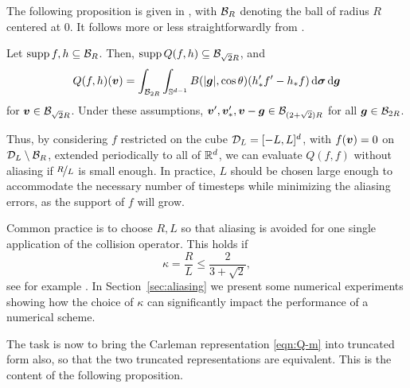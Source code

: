 The following proposition is given in \cite{Pareschi00}, with $\mathcal{B}_R$ denoting
the ball of radius $R$ centered at $0$. It follows more or less straightforwardly from \cite{Pareschi96}.
\begin{proposition} \label{prop:trunc}
Let $\operatorname{supp} f,h\subseteq\mathcal{B}_R$. Then, $\operatorname{supp} Q(f,h)\subseteq\mathcal{B}_{\sqrt{2}R}$, and 
\[ 
    Q(f,h)({\bm v}) = \int_{\mathcal{B}_{2R}}\int_{\mathbb{S}^{d-1}} 
            B(|{\bm g}|,\cos\theta)(h_*'f'-h_*f)\,\mathrm{d}{\bm\sigma} \,\mathrm{d} {\bm g} 
\]
for ${\bm v}\in\mathcal{B}_{\sqrt{2}R}$. Under these assumptions,
${\bm v}',{\bm v}_*',{\bm v}-{\bm g}\in\mathcal{B}_{(2+\sqrt{2})R}$ for all ${\bm g}\in\mathcal{B}_{2R}$.
\end{proposition}
Thus, by considering $f$ restricted on the cube $\mathcal{D}_L=[-L,L]^d$, with
$f({\bm v})=0$ on $\mathcal{D}_L\setminus\mathcal{B}_R$, extended periodically to all of $\mathbb{R}^d$, we
can evaluate $Q(f,f)$ without aliasing if $\nicefrac{R}{L}$ is small enough. In
practice, $L$ should be chosen large enough to accommodate the necessary number
of timesteps while minimizing the aliasing errors, as the support of $f$ will
grow.

Common practice \cite{Pareschi00, Mouhot06} is to choose $R,L$ so that aliasing is avoided for one
single application of the collision operator. This holds if
$$
    \kappa = \frac{R}{L} \leq \frac{2}{3+\sqrt{2}},
$$
see for example \cite[Fig. 1]{Pareschi00}.  In Section~\ref{sec:aliasing} we present some numerical
experiments showing how the choice of $\kappa$ can significantly impact the performance of a numerical scheme.

The task is now to bring the Carleman representation \eqref{eqn:Q-m} into
truncated form also, so that the two truncated representations are equivalent.
This is the content of the following proposition.

